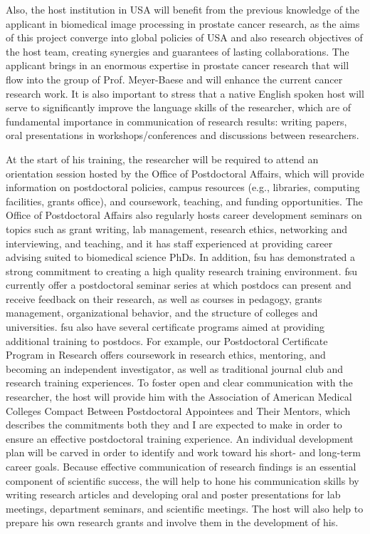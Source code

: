 Also, the host institution in USA will benefit from the previous knowledge of the applicant in biomedical image processing in prostate cancer research, as the aims of this project converge into global policies of USA and also research objectives of the host team, creating synergies and guarantees of lasting collaborations.
The applicant brings in an enormous expertise in prostate cancer research that will flow into the group of Prof. Meyer-Baese and will enhance the current cancer research work.
It is also important to stress that a native English spoken host will serve to significantly improve the language skills of the researcher, which are of fundamental importance in communication of research results: writing papers, oral presentations in workshops/conferences and discussions between researchers.

At the start of his training, the researcher will be required to attend an orientation session hosted by the Office of Postdoctoral Affairs, which will provide information on postdoctoral policies, campus resources (e.g., libraries, computing facilities, grants office), and coursework, teaching, and funding opportunities.
The Office of Postdoctoral Affairs also regularly hosts career development seminars on topics such as grant writing, lab management, research ethics, networking and interviewing, and teaching, and it has staff experienced at providing career advising suited to biomedical science PhDs.  
In addition, \ac{fsu} has demonstrated a strong commitment to creating a high quality research training environment. 
\ac{fsu} currently offer a postdoctoral seminar series at which postdocs can present and receive feedback on their research, as well as courses in pedagogy, grants management, organizational behavior, and the structure of colleges and universities.
\ac{fsu} also have several certificate programs aimed at providing additional training to postdocs.
For example, our Postdoctoral Certificate Program in Research offers coursework in research ethics, mentoring, and becoming an independent investigator, as well as traditional journal club and research training experiences.
To foster open and clear communication with the researcher, the host will provide him with the Association of American Medical Colleges Compact Between Postdoctoral Appointees and Their Mentors, which describes the commitments both they and I are expected to make in order to ensure an effective postdoctoral training experience.
An individual development plan will be carved in order to identify and work toward his short- and long-term career goals.  
Because effective communication of research findings is an essential component of scientific success, the  will help to hone his communication skills by writing research articles and developing oral and poster presentations for lab meetings, department seminars, and scientific meetings.
The host will also help  to prepare his own research grants and involve them in the development of his. 

